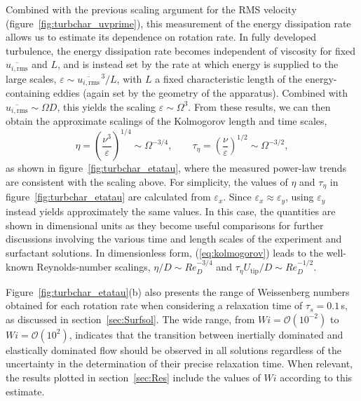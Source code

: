 \documentclass[aps,prfluids,groupedaddress,showkeys,11pt,tightenlines]{revtex4-2}
\begin{document}
Combined with the previous scaling argument for the RMS velocity (figure~\ref{fig:turbchar_uvprime}), this measurement of the energy dissipation rate allows us to estimate its dependence on rotation rate. In fully developed turbulence, the energy dissipation rate becomes independent of viscosity for fixed $\overline{u_{i,\mathrm{rms}}}$ and $L$, and is instead set by the rate at which energy is supplied to the large scales, $\varepsilon \sim \overline{u_{i,\mathrm{rms}}}^{\,3}/L$, with $L$ a fixed characteristic length of the energy-containing eddies (again set by the geometry of the apparatus). Combined with $\overline{u_{i,\mathrm{rms}}}\sim\Omega D$, this yields the scaling $\varepsilon \sim \Omega^3$. From these results, we can then obtain the approximate scalings of the Kolmogorov length and time scales,
\begin{equation}
    \eta = \left(\frac{\nu^3}{\varepsilon}\right)^{1/4} \sim \Omega^{-3/4},
    \qquad
    \tau_\eta = \left(\frac{\nu}{\varepsilon}\right)^{1/2} \sim \Omega^{-3/2},
    \label{eq:kolmogorov}
\end{equation}
as shown in figure~\ref{fig:turbchar_etatau}, where the measured power-law trends are consistent with the scaling above. For simplicity, the values of $\eta$ and $\tau_\eta$ in figure~\ref{fig:turbchar_etatau} are calculated from $\varepsilon_x$. Since $\varepsilon_x\approx\varepsilon_y$, using $\varepsilon_y$ instead yields approximately the same values. In this case, the quantities are shown in dimensional units as they become useful comparisons for further discussions involving the various time and length scales of the experiment and surfactant solutions. In dimensionless form, (\ref{eq:kolmogorov}) leads to the well-known Reynolds-number scalings, $\eta/D \sim Re_D^{-3/4}$ and $\tau_\eta U_{\mathrm{tip}}/D \sim Re_D^{-1/2}$.

Figure~\ref{fig:turbchar_etatau}(b) also presents the range of Weissenberg numbers obtained for each rotation rate when considering a relaxation time of $\tau_s = 0.1$\,s, as discussed in section~\ref{sec:Surfsol}. The wide range, from $Wi = \mathcal{O}(10^{-2})$ to $Wi = \mathcal{O}(10^{2})$, indicates that the transition between inertially dominated and elastically dominated flow should be observed in all solutions regardless of the uncertainty in the determination of their precise relaxation time. When relevant, the results plotted in section~\ref{sec:Res} include the values of $Wi$ according to this estimate.
\end{document}
